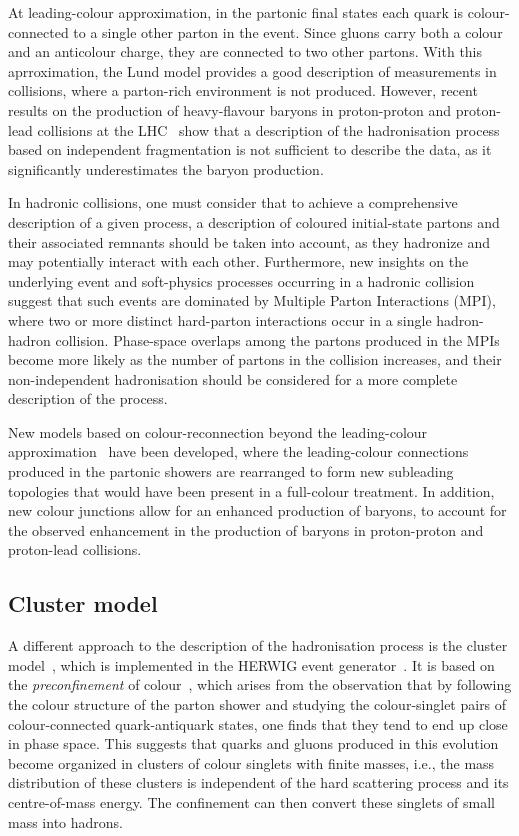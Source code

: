 At leading-colour approximation, in the partonic final states each quark is colour-connected to a single other parton in the event. Since gluons carry both a colour and an anticolour charge, they are connected to two other partons. With this aprroximation, the Lund model provides a good description of measurements in \ee collisions, where a parton-rich environment is not produced. However, recent results on the production of heavy-flavour baryons in proton-proton and proton-lead collisions at the LHC~\cite{ALICE:2022exq,ALICE:xic0} show that a description of the hadronisation process based on independent fragmentation is not sufficient to describe the data, as it significantly underestimates the baryon production.

In hadronic collisions, one must consider that to achieve a comprehensive description of a given process, a description of coloured initial-state partons and their associated remnants should be taken into account, as they hadronize and may potentially interact with each other. Furthermore, new insights on the underlying event and soft-physics processes occurring in a hadronic collision suggest that such events are dominated by Multiple Parton Interactions (MPI), where two or more distinct hard-parton interactions occur in a single hadron-hadron collision. Phase-space overlaps among the partons produced in the MPIs become more likely as the number of partons in the collision increases, and their non-independent hadronisation should be considered for a more complete description of the process. 

New models based on colour-reconnection beyond the leading-colour approximation~\cite{Christiansen:2015yqa} have been developed, where the leading-colour connections produced in the partonic showers are rearranged to form new subleading topologies that would have been present in a full-colour treatment. In addition, new colour junctions allow for an enhanced production of baryons, to account for the observed enhancement in the production of baryons in proton-proton and proton-lead collisions.

\subsection{Cluster model}
A different approach to the description of the hadronisation process is the cluster model~\cite{Webber:1983if}, which is implemented in the HERWIG event generator~\cite{Bahr:2008pv}. It is based on the \emph{preconfinement} of colour~\cite{Amati:1979fg}, which arises from the observation that by following the colour structure of the parton shower and studying the colour-singlet pairs of colour-connected quark-antiquark states, one finds that they tend to end up close in phase space. This suggests that quarks and gluons produced in this evolution become organized in clusters of colour singlets with finite masses, i.e., the mass distribution of these clusters is independent of the hard scattering process and its centre-of-mass energy. The confinement can then convert these singlets of small mass into hadrons. 

